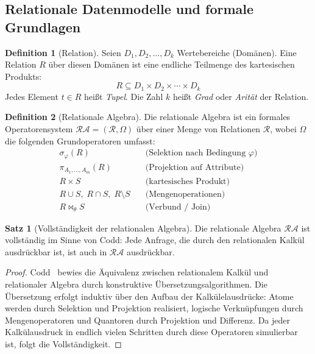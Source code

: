 ﻿\documentclass[a4paper,12pt]{article}
\theoremstyle{definition}
\newtheorem{definition}{Definition}
\newtheorem{satz}{Satz}
\begin{document}
\subsection{Relationale Datenmodelle und formale Grundlagen}

\begin{definition}[Relation]
\label{def:relation}
Seien $D_1, D_2, \ldots, D_k$ Wertebereiche (Domänen). Eine Relation $R$ über diesen Domänen ist eine endliche Teilmenge des kartesischen Produkts:
\[
R \subseteq D_1 \times D_2 \times \cdots \times D_k
\]
Jedes Element $t \in R$ heißt \emph{Tupel}. Die Zahl $k$ heißt \emph{Grad} oder \emph{Arität} der Relation.
\end{definition}

\begin{definition}[Relationale Algebra]
\label{def:algebra}
Die relationale Algebra ist ein formales Operatorensystem $\mathcal{RA} = (\mathcal{R}, \Omega)$ über einer Menge von Relationen $\mathcal{R}$, wobei $\Omega$ die folgenden Grundoperatoren umfasst:
\begin{align*}
\sigma_\varphi(R) &\quad \text{(Selektion nach Bedingung $\varphi$)} \\
\pi_{A_1,\ldots,A_m}(R) &\quad \text{(Projektion auf Attribute)} \\
R \times S &\quad \text{(kartesisches Produkt)} \\
R \cup S, \; R \cap S, \; R \setminus S &\quad \text{(Mengenoperationen)} \\
R \bowtie_\theta S &\quad \text{(Verbund / Join)}
\end{align*}
\end{definition}

\begin{satz}[Vollständigkeit der relationalen Algebra]
\label{satz:vollstaendigkeit}
Die relationale Algebra $\mathcal{RA}$ ist vollständig im Sinne von Codd: Jede Anfrage, die durch den relationalen Kalkül ausdrückbar ist, ist auch in $\mathcal{RA}$ ausdrückbar.
\end{satz}

\begin{proof}
Codd~\cite{codd1970} bewies die Äquivalenz zwischen relationalem Kalkül und relationaler Algebra durch konstruktive Übersetzungsalgorithmen. Die Übersetzung erfolgt induktiv über den Aufbau der Kalkülelausdrücke: Atome werden durch Selektion und Projektion realisiert, logische Verknüpfungen durch Mengenoperatoren und Quantoren durch Projektion und Differenz. Da jeder Kalkülausdruck in endlich vielen Schritten durch diese Operatoren simulierbar ist, folgt die Vollständigkeit.
\end{proof}
\end{document}
